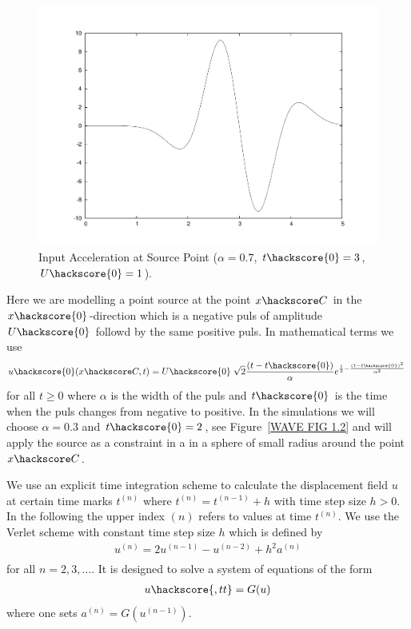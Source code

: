 \begin{figure}[t!]
\centerline{\includegraphics[angle=-90,width=4.in]{figures/wavea}}
\caption{Input Acceleration at Source Point ($\alpha=0.7$, $t\hackscore{0}=3$, $U\hackscore{0}=1$).}
\label{WAVE FIG 1.1}
\end{figure}

Here we are modelling a point source at the point $x\hackscore C$ in the $x\hackscore{0}$-direction
which is a negative puls of amplitude $U\hackscore{0}$ followd by the same 
positive puls. In mathematical terms we use
\begin{eqnarray} \label{WAVE source}
u\hackscore{0}(x\hackscore C,t)= U\hackscore{0} \; \sqrt{2}  \frac{(t-t\hackscore{0})}{\alpha} e^{\frac{1}{2}-\frac{(t-t\hackscore{0})^2}{\alpha^2}} \ 
\end{eqnarray}
for all $t\ge0$ where $\alpha$ is the width of the puls and $t\hackscore{0}$ is the time when
the puls changes from negative to positive. In the simulations we will choose $\alpha=0.3$ and $t\hackscore{0}=2$, see Figure~\ref{WAVE FIG 1.2}
and will apply the source as a constraint in a in a sphere of small radius around the point
$x\hackscore C$.  

 We use an explicit time integration scheme to calculate the displacement field $u$ at 
certain time marks $t^{(n)}$ where $t^{(n)}=t^{(n-1)}+h$ with time step size $h>0$. In the following the upper index ${(n)}$ refers to values at time $t^{(n)}$. We use the Verlet scheme  with constant time step size $h$
which is defined by
\begin{eqnarray} \label{WAVE dyn 2}
u^{(n)}=2u^{(n-1)}-u^{(n-2)} + h^2 a^{(n)} \\
\end{eqnarray}
for all $n=2,3,\ldots$. It is designed to solve a system of equations of the form
\begin{eqnarray} \label{WAVE dyn 2b} 
u\hackscore{,tt}=G(u)
\end{eqnarray}
where one sets $a^{(n)}=G(u^{(n-1)})$.

